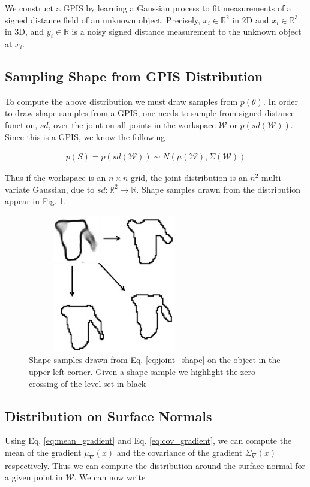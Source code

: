 \documentclass[journal,transmag]{IEEEtran}%
\begin{document}
We construct a GPIS by learning a Gaussian process to fit measurements of a signed distance field of an unknown object.  Precisely, $x_i \in \mathbb{R}^2$ in 2D and $x_i \in \mathbb{R}^3$ in 3D, and $y_i \in \mathbb{R}$ is a noisy signed distance measurement to the unknown object at $x_i$.



\subsection{Sampling Shape from GPIS Distribution }
To compute the above distribution we must draw samples from $p(\theta)$. In order to draw shape samples from a GPIS, one needs to sample from signed distance function, $sd$, over the joint on all points in the workspace $\mathcal{W}$ or $p(sd(\mathcal{W}))$. Since this is a GPIS, we know the following 

\vspace{-2ex}
\begin{align}\label{eq:joint_shape}
p(S) = p(sd(\mathcal{W})) \sim N(\mu(\mathcal{W}),\Sigma(\mathcal{W}))
\end{align}

Thus if the workspace is an $n \times n$ grid, the joint distribution is an  $n^2$ multi-variate Gaussian, due to $sd:\mathbb{R}^2 \rightarrow \mathbb{R}$.  Shape samples drawn from the distribution appear in Fig. \ref{fig:shape_samples}.


\begin{figure}[ht!]
\centering
\includegraphics[width = 7.5cm, height= 6cm ]{figures/Slide13.jpg}
\caption{Shape samples drawn from Eq. \ref{eq:joint_shape} on the object in the upper left corner. Given a shape sample we highlight the zero-crossing of the level set in black}
\vspace*{-10pt}
\label{fig:shape_samples}
\end{figure}

\subsection{Distribution on Surface Normals}\label{sec:normals} 
Using Eq. \ref{eq:mean_gradient} and Eq. \ref{eq:cov_gradient}, we can compute the mean of the gradient $ \mu_{\nabla}(x)$ and the covariance of the gradient $\Sigma_{\nabla}(x)$ respectively. Thus we can compute the distribution around the surface normal for a given point in $\mathcal{W}$. We can now write 
\end{document}

